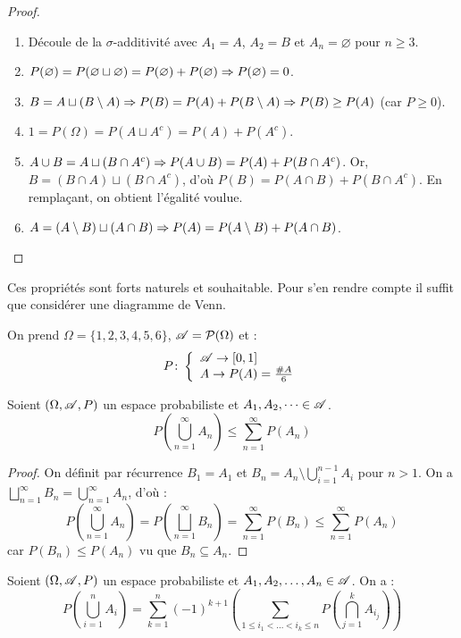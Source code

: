 \begin{proof}
    \begin{enumerate}
        \item Découle de la $\sigma$-additivité avec $A_1=A$, $A_2=B$ et $A_n=\varnothing$ pour $n \ge 3$.
        \item $P(\varnothing) = P(\varnothing \sqcup \varnothing) = P(\varnothing) + P(\varnothing) \Rightarrow P(\varnothing) = 0$.
        \item $B=A\sqcup (B\setminus A)\Rightarrow P(B)= P(A)+ P(B\setminus A)\Rightarrow P(B) \ge P(A)$ (car $P \ge 0$).
        \item $1 = P(\Omega) = P(A\sqcup A^c) = P(A)+P(A^c)$.
        \item $A\cup B= A\sqcup (B\cap A^c)\Rightarrow P(A\cup B)= P(A) + P(B\cap A^c)$. Or, $B = (B\cap A) \sqcup (B\cap A^c)$, d'où $P(B) = P(A\cap B) + P(B\cap A^c)$. En remplaçant, on obtient l'égalité voulue.
        \item $A = (A\setminus B)\sqcup(A\cap B)\Rightarrow P(A) = P(A\setminus B) + P(A\cap B)$.
    \end{enumerate}
\end{proof}

Ces propriétés sont forts naturels et souhaitable. Pour s'en rendre compte il suffit que considérer une diagramme de Venn.

\begin{exemple}[Lancer d'un dé]
    On prend $\Omega = \{1,2,3,4,5,6\}$, $\mathscr{A} = \mathcal{P}(\Omega)$ et :
    \[
    P\colon \left\{\begin{array}{l}\mathscr{A}\to\left[ 0,1\right] \\A\to P(A) = \frac{\# A}{6}\end{array}\right.
    \]
\end{exemple}

\begin{proposition}
    Soient $(\Omega,\mathscr{A}, P)$ un espace probabiliste et $A_1,A_2,\dots \in \mathscr{A}$.
    \[
    P\left(\bigcup_{n=1}^{\infty}A_n\right)\leq \sum_{n=1}^\infty P(A_n)
    \]
\end{proposition}

\begin{proof}
    On définit par récurrence $B_1 = A_1$ et $B_n = A_n\setminus \bigcup_{i = 1}^{n-1}A_i$ pour $n > 1$. On a $\bigsqcup_{n=1}^\infty B_n = \bigcup_{n=1}^\infty A_n$, d'où :
    \[
    P\left(\bigcup_{n = 1}^\infty A_n\right) = P\left(\bigsqcup_{n = 1}^\infty B_n\right) = \sum_{n = 1}^\infty P(B_n) \le \sum_{n = 1}^\infty P(A_n)
    \]
    car $P(B_n)\le P(A_n)$ vu que $B_n\subseteq A_n$.
\end{proof}

\begin{proposition}
    Soient $(\Omega,\mathscr{A}, P)$ un espace probabiliste et $A_1,A_2,\dots, A_n \in \mathscr{A}$. On a :
    \[
    P\left(\bigcup_{i=1}^n A_i \right)= \sum_{k=1}^n (-1)^{k+1}\left( \sum_{1\leq i_1<\dots<i_k\leq n} P\left(\bigcap_{j=1}^k A_{i_j}\right)\right)
    \]
\end{proposition}

